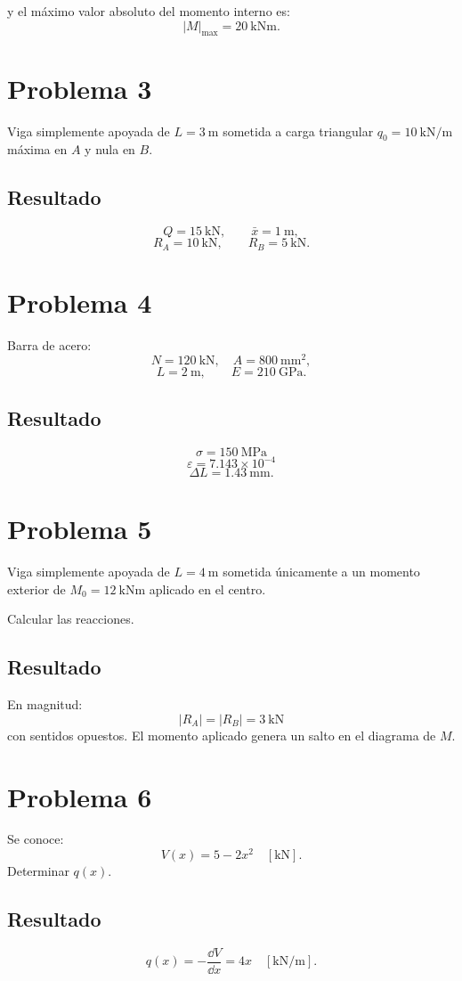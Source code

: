 \]
y el máximo valor absoluto del momento interno es:
\[
|M|_{\max}=\boxed{\qty{20}{\kilo\newton\metre}}.
\]

\section*{Problema 3}
Viga simplemente apoyada de $L=\qty{3}{\metre}$ sometida a carga triangular $q_0=\qty{10}{\kilo\newton\per\metre}$ máxima en $A$ y nula en $B$.

\subsection*{Resultado}
\[
Q=\qty{15}{\kilo\newton},\qquad \bar x=\qty{1}{\metre},
\]
\[
\boxed{R_A=\qty{10}{\kilo\newton},\qquad R_B=\qty{5}{\kilo\newton}}.
\]

\section*{Problema 4}
Barra de acero:
\[
N=\qty{120}{\kilo\newton},\quad A=\qty{800}{\milli\metre\squared},
\]
\[
L=\qty{2}{\metre},\qquad E=\qty{210}{\giga\pascal}.
\]

\subsection*{Resultado}
\[
\boxed{\sigma=\qty{150}{\mega\pascal}}
\]
\[
\boxed{\varepsilon=7.143\times10^{-4}}
\]
\[
\boxed{\Delta L=\qty{1.43}{\milli\metre}}.
\]

\section*{Problema 5}
Viga simplemente apoyada de $L=\qty{4}{\metre}$ sometida únicamente a un momento exterior de $M_0=\qty{12}{\kilo\newton\metre}$ aplicado en el centro.

Calcular las reacciones.

\subsection*{Resultado}
En magnitud:
\[
\boxed{|R_A|=|R_B|=\qty{3}{\kilo\newton}}
\]
con sentidos opuestos. El momento aplicado genera un salto en el diagrama de $M$.

\section*{Problema 6}
Se conoce:
\[
V(x)=5-2x^2\quad[\mathrm{kN}].
\]
Determinar $q(x)$.

\subsection*{Resultado}
\[
q(x)=-\frac{\dd V}{\dd x}=\boxed{4x\quad[\mathrm{kN/m}]}.
\]

